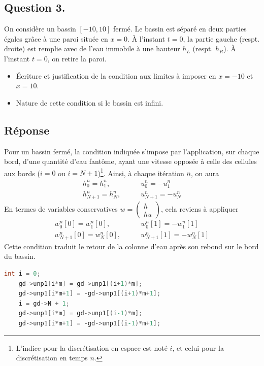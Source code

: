 \documentclass[
	french,
	11pt, %
]{fphw}
\newcommand{\myvec}[2]{\begin{pmatrix} #1  \\ #2 \end{pmatrix}}   %
\begin{document}
\subsection*{Question 3.}
\begin{problem}
	On considère un bassin $[- 10, 10]$ fermé. Le bassin est séparé en deux parties égales grâce à une paroi située en $x = 0$. À l'instant $t = 0$, la partie gauche (respt. droite) est remplie avec de l'eau immobile à une hauteur $h_L$ (respt. $h_R$). À l'instant $t = 0$, on retire la paroi. 
	\begin{itemize}
		\item Écriture et justification de la condition aux limites à imposer en $x = -10$ et $x = 10$.
		\item Nature de cette condition si le bassin est infini.
	\end{itemize} 
\end{problem}


\subsection*{Réponse} 

Pour un bassin fermé, la condition indiquée s'impose par l'application, sur chaque bord, d'une quantité d'eau fantôme, ayant une vitesse opposée à celle des cellules aux bords ($i=0$ ou $i=N+1$)\footnote{L'indice pour la discrétisation en espace est noté $i$, et celui pour la discrétisation en temps $n$.}. Ainsi, à chaque itération $n$, on aura 
\begin{align*}
	h_0^n = h_1^n, &\qquad u_0^n = - u_1^n \\
	h_{N+1}^n = h_N^n, &\qquad u_{N+1}^n = - u_N^n
\end{align*}
En termes de variables conservatives $w=\myvec{h}{hu}$, cela reviens à appliquer 
\begin{align*}
	w_0^n[0] = w_1^n[0], &\qquad w_0^n[1] = - w_1^n[1] \\
	w_{N+1}^n[0] = w_{N}^n[0], &\qquad w_{N+1}^n[1] = - w_{N}^n[1]
\end{align*}
Cette condition traduit le retour de la colonne d'eau après son rebond sur le bord du bassin.

\begin{lstlisting}[language=C, caption={Implementation des conditions aux limites pour un bassin fermé.},breaklines]
	int i = 0;
	gd->unp1[i*m] = gd->unp1[(i+1)*m];
	gd->unp1[i*m+1] = -gd->unp1[(i+1)*m+1];
	i = gd->N + 1;
	gd->unp1[i*m] = gd->unp1[(i-1)*m];
	gd->unp1[i*m+1] = -gd->unp1[(i-1)*m+1];
\end{lstlisting}
\end{document}

